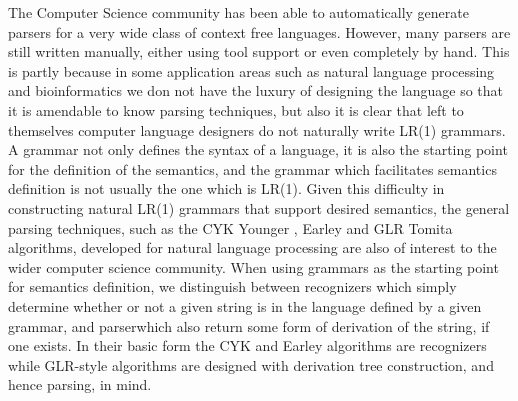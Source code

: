 \begin{isabellebody}
\begin{isamarkuptext}
\end{isamarkuptext}\isamarkuptrue%
%
\isadelimdocument
%
\endisadelimdocument
%
\isatagdocument
%
\isamarkuptrue%
%
\endisatagdocument
{\isafolddocument}%
%
\isadelimdocument
%
\endisadelimdocument
%
\begin{isamarkuptext}%
The Computer Science community has been able to automatically generate parsers for a very wide class of context
free languages. However, many parsers are still written manually, either using tool support or even completely
by hand. This is partly because in some application areas such as natural language processing and bioinformatics
we don not have the luxury of designing the language so that it is amendable to know parsing techniques, but also
it is clear that left to themselves computer language designers do not naturally write LR(1) grammars. A grammar
not only defines the syntax of a language, it is also the starting point for the definition of the semantics,
and the grammar which facilitates semantics definition is not usually the one which is LR(1). Given this difficulty
in constructing natural LR(1) grammars that support desired semantics, the general parsing techniques, such as
the CYK Younger \cite{Younger:1967}, Earley \cite{Earley:1970} and GLR Tomita \cite{Tomita:1985} algorithms, developed
for natural language processing are also of interest to the wider computer science community. When using grammars as
the starting point for semantics definition, we distinguish between recognizers which simply determine whether or not
a given string is in the language defined by a given grammar, and parserwhich also return some form of derivation
of the string, if one exists. In their basic form the CYK and Earley algorithms are recognizers while GLR-style
algorithms are designed with derivation tree construction, and hence parsing, in mind.


\end{isamarkuptext}
\end{isabellebody}
